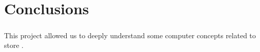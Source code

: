 \documentclass{report}
\begin{document}
	        \paragraph{}
	        
	        \paragraph{}

	\chapter{Conclusions}
	
	        \paragraph{}This project allowed us to deeply understand some computer concepts related to store .
	        
	        \paragraph{}
			
\end{document}
